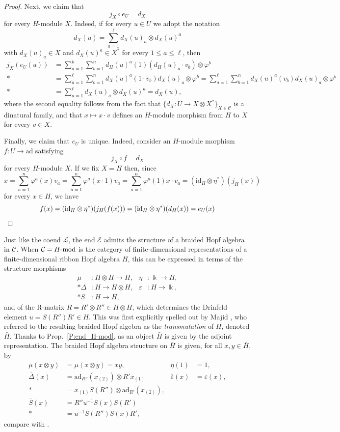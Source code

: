 \documentclass[a4paper,reqno]{amsart}
\theoremstyle{definition}
\theoremstyle{remark}
\newcommand{\calC}{\mathcal{C}}
\newcommand{\calE}{\mathcal{E}}
\newcommand{\calL}{\mathcal{L}}
\renewcommand{\epsilon}{\varepsilon}
\renewcommand{\phi}{\varphi}
\newcommand{\ad}{\mathrm{ad}}
\newcommand{\id}{\mathrm{id}}
\newcommand{\leqs}{\leqslant}
\newcommand{\mods}[1]{\operatorname{\mathnormal{#1}-mod}}
\begin{document}
\begin{proof}
 Next, we claim that
 \[
  j_X \circ e_U = d_X
 \]
 for every $H$-module $X$. Indeed, if for every $u \in U$ we adopt the notation
 \[
  d_X(u) = \sum_{a=1}^\ell d_X(u)_a \otimes d_X(u)^a
 \]
 with $d_X(u)_a \in X$ and $d_X(u)^a \in X^*$ for every $1 \leqs a \leqs \ell$, then
 \begin{align*}
  j_X(e_U(u)) &= \sum_{a=1}^k \sum_{b=1}^n d_H(u)^a(1) (d_H(u)_a \cdot v_b) \otimes \phi^b \\*
  &= \sum_{a=1}^\ell \sum_{b=1}^n d_X(u)^a(1 \cdot v_b) d_X(u)_a \otimes \phi^b 
  = \sum_{a=1}^\ell \sum_{b=1}^n d_X(u)^a(v_b) d_X(u)_a \otimes \phi^b \\*
  &= \sum_{a=1}^\ell d_X(u)_a \otimes d_X(u)^a 
  = d_X(u),
 \end{align*}
 where the second equality follows from the fact that $\{ d_X : U \to X \otimes X^* \}_{X \in \calC}$ is a dinatural family, and that $x \mapsto x \cdot v$ defines an $H$-module morphism from $H$ to $X$ for every $v \in X$.
 
 Finally, we claim that $e_U$ is unique. Indeed, consider an $H$-module morphism $f : U \to \ad$ satisfying
 \[
  j_X \circ f = d_X
 \]
 for every $H$-module $X$. If we fix $X = H$ then, since 
 \[
  x = \sum_{a=1}^n \phi^a(x) v_a = \sum_{a=1}^n \phi^a(x \cdot 1) v_a = \sum_{a=1}^n \phi^a(1) x \cdot v_a = (\id_H \otimes \eta^*)(j_H(x))
 \]
 for every $x \in H$, we have 
 \[
  f(x) = (\id_H \otimes \eta^*)(j_H(f(x)))
  = (\id_H \otimes \eta^*)(d_H(x))
  = e_U(x) \qedhere
 \]
\end{proof}

Just like the coend $\calL$, the end $\calE$ admits the structure of a braided Hopf algebra in $\calC$. When $\calC = \mods{H}$ is the category of finite-dimensional representations of a finite-dimensional ribbon Hopf algebra $H$, this can be expressed in terms of the structure morphisms 
\begin{align*}
 \mu &: H \otimes H \to H, &
 \eta &: \Bbbk \to H, \\*
 \Delta &: H \to H \otimes H, &
 \epsilon &: H \to \Bbbk, \\*
 S &: H \to H, &
 &
\end{align*}
and of the R-matrix $R = R' \otimes R'' \in H \otimes H$, which determines the Drinfeld element $u = S(R'')R' \in H$. This was first explicitly spelled out by Majid \cite{M91b}, who referred to the resulting braided Hopf algebra as the \textit{transmutation} of $H$, denoted $\bar{H}$. Thanks to Prop.~\ref{P:end_H-mod}, as an object $\bar{H}$ is given by the adjoint representation. The braided Hopf algebra structure on $\bar{H}$ is given, for all $x,y \in \bar{H}$, by
\begin{align*}
 \bar{\mu}(x \otimes y) &= \mu(x \otimes y) = xy, &
 \bar{\eta}(1) &= 1, \\
 \bar{\Delta}(x) &= \ad_{R''}(x_{(2)}) \otimes R'x_{(1)} &
 \bar{\varepsilon}(x) &= \varepsilon(x), \\*
 &= x_{(1)}S(R'') \otimes \ad_{R'}(x_{(2)}), & & \\
 \bar{S}(x) &= R''u^{-1}S(x)S(R') &
 & \\*
 &= u^{-1}S(R'')S(x)R', &
 &
\end{align*}
compare with \cite[Sec.~3.4]{L94}.
\end{document}
